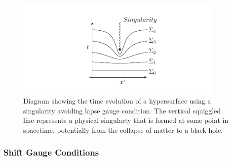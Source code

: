 \begin{figure}[h!]
    \includegraphics[width=0.9\textwidth]{svg/foliation.png} 
      \caption{Diagram showing the time evolution of a hypersurface using a singularity avoiding lapse gauge condition. The vertical squiggled line represents a physical singularty that is formed at some point in spacetime, potentially from the collapse of matter to a black hole.} \label{nr:fig:singularity_avoiding}
\end{figure}


\subsubsection{Shift Gauge Conditions}

